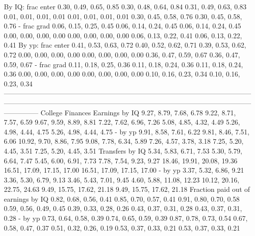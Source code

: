                      By IQ: frac enter       0.30, 0.49, 0.65, 0.85       0.30, 0.48, 0.64, 0.84   0.31, 0.49, 0.63, 0.83    0.01, 0.01, 0.01, 0.01      0.01, 0.01, 0.01, 0.01      0.30, 0.45, 0.58, 0.76      0.30, 0.45, 0.58, 0.76
                           - frac grad       0.06, 0.15, 0.25, 0.45       0.06, 0.14, 0.24, 0.45   0.06, 0.14, 0.24, 0.45    0.00, 0.00, 0.00, 0.00      0.00, 0.00, 0.00, 0.00      0.06, 0.13, 0.22, 0.41      0.06, 0.13, 0.22, 0.41
                     By yp: frac enter       0.41, 0.53, 0.63, 0.72       0.40, 0.52, 0.62, 0.71   0.39, 0.53, 0.62, 0.72    0.00, 0.00, 0.00, 0.00      0.00, 0.00, 0.00, 0.00      0.36, 0.47, 0.59, 0.67      0.36, 0.47, 0.59, 0.67
                           - frac grad       0.11, 0.18, 0.25, 0.36       0.11, 0.18, 0.24, 0.36   0.11, 0.18, 0.24, 0.36    0.00, 0.00, 0.00, 0.00      0.00, 0.00, 0.00, 0.00      0.10, 0.16, 0.23, 0.34      0.10, 0.16, 0.23, 0.34
---------------------------------------------------------------------------------------------------------------------------------------------------------------------------------------------------------------------------------------
                      College Finances                                                                                                                                                                                                 
                        Earnings by IQ       9.27, 8.79, 7.68, 6.78       9.22, 8.71, 7.57, 6.59   9.67, 9.59, 8.89, 8.81    7.22, 7.62, 6.96, 7.26      5.08, 4.85, 4.32, 4.49      5.26, 4.98, 4.44, 4.75      5.26, 4.98, 4.44, 4.75
                               - by yp       9.91, 8.58, 7.61, 6.22       9.81, 8.46, 7.51, 6.06  10.92, 9.70, 8.86, 7.95    9.08, 7.78, 6.34, 5.89      7.26, 4.57, 3.78, 3.18      7.25, 5.20, 4.45, 3.51      7.25, 5.20, 4.45, 3.51
                       Transfers by IQ       5.34, 5.83, 6.71, 7.53       5.30, 5.79, 6.64, 7.47   5.45, 6.00, 6.91, 7.73    7.78, 7.54, 9.23, 9.27  18.46, 19.91, 20.08, 19.36  16.51, 17.09, 17.15, 17.00  16.51, 17.09, 17.15, 17.00
                               - by yp       3.37, 5.32, 6.86, 9.21       3.36, 5.30, 6.79, 9.13   3.46, 5.43, 7.01, 9.45  4.60, 5.88, 11.08, 12.23  10.12, 20.16, 22.75, 24.63   9.49, 15.75, 17.62, 21.18   9.49, 15.75, 17.62, 21.18
   Fraction paid out of earnings by IQ       0.82, 0.68, 0.56, 0.41       0.85, 0.70, 0.57, 0.41   0.91, 0.80, 0.70, 0.58    0.59, 0.56, 0.49, 0.45      0.39, 0.33, 0.28, 0.26      0.43, 0.37, 0.31, 0.28      0.43, 0.37, 0.31, 0.28
                               - by yp       0.73, 0.64, 0.58, 0.39       0.74, 0.65, 0.59, 0.39   0.87, 0.78, 0.73, 0.54    0.67, 0.58, 0.47, 0.37      0.51, 0.32, 0.26, 0.19      0.53, 0.37, 0.33, 0.21      0.53, 0.37, 0.33, 0.21
